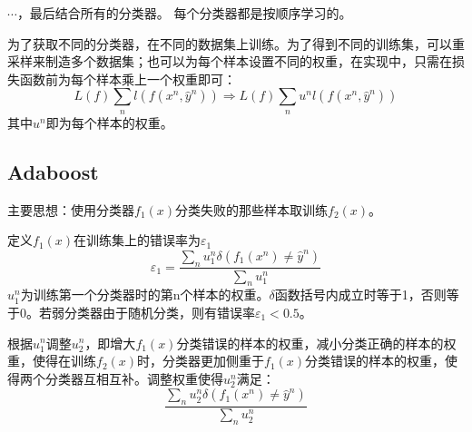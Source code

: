 \documentclass[UTF8]{ctexart} %
\begin{document}
			$\cdots$，最后结合所有的分类器。
			每个分类器都是按顺序学习的。
			
			为了获取不同的分类器，在不同的数据集上训练。为了得到不同的训练集，可以重采样来制造多个数据集；也可以为每个样本设置不同的权重，在实现中，只需在损失函数前为每个样本乘上一个权重即可：
			\[L(f)\sum_nl(f(x^n,\hat{y}^n))\Longrightarrow L(f)\sum_nu^nl(f(x^n,\hat{y}^n))\]
			其中$u^n$即为每个样本的权重。
		\subsection{Adaboost}
			主要思想：使用分类器$f_1(x)$分类失败的那些样本取训练$f_2(x)$。
			
			定义$f_1(x)$在训练集上的错误率为$\varepsilon_1$
			\[\varepsilon_1 = \frac{\sum_nu_1^n\delta(f_1(x^n)\neq\hat{y}^n)}{\sum_nu_1^n}\]
			$u_1^n$为训练第一个分类器时的第n个样本的权重。$\delta$函数括号内成立时等于1，否则等于0。若弱分类器由于随机分类，则有错误率$\varepsilon_1<0.5$。
			
			根据$u_1^n$调整$u_2^n$，即增大$f_1(x)$分类错误的样本的权重，减小分类正确的样本的权重，使得在训练$f_2(x)$时，分类器更加侧重于$f_1(x)$分类错误的样本的权重，使得两个分类器互相互补。调整权重使得$u_2^n$满足：
			\[\frac{\sum_nu_2^n\delta(f_1(x^n)\neq\hat{y}^n)}{\sum_nu_2^n}\]
			\begin{figure}[H]
			\end{figure}
			
			
			
			
			
			
		
\end{document}
